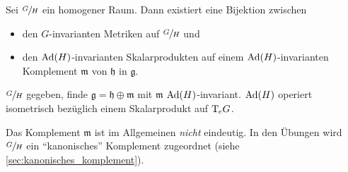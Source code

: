 \begin{korollar}[{name=[Bijektion zw. Metriken auf Quotient und $\Ad(H)$-inv. Skalarprodukten auf Komplement]},label=kor:3113]
	Sei $\sfrac{G}{H}$ ein homogener Raum.
	Dann existiert eine Bijektion zwischen
	\begin{itemize}
		\item den $G$-invarianten Metriken auf $\sfrac{G}{H}$ und
		\item den $\Ad(H)$-invarianten Skalarprodukten auf einem $\Ad(H)$-invarianten Komplement $\mathfrak{m}$ von $\mathfrak{h}$ in $\mathfrak{g}$.
	\end{itemize}
\end{korollar}
\begin{beweis}[Rezept]
	$\sfrac{G}{H}$ gegeben, finde $\mathfrak{g} = \mathfrak{h} \oplus \mathfrak{m}$ mit $\mathfrak{m}$ $\Ad(H)$-invariant.
	$\Ad(H)$ operiert isometrisch bezüglich einem Skalarprodukt auf $\mathrm{T}\mkern-0.85mu_e G$.
\end{beweis}

\begin{bemerkung*}[{name=[Eindeutigkeit des Komplements]}]
	Das Komplement $\mathfrak{m}$ ist im Allgemeinen \emph{nicht} eindeutig.
	In den Übungen wird $\sfrac{G}{H}$ ein \enquote{kanonisches} Komplement zugeordnet (siehe \cref{sec:kanonisches_komplement}).
\end{bemerkung*}

